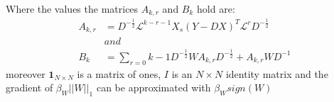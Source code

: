 Where the values the matrices $A_{k,r}$ and $B_k$ hold are:
\begin{align}
A_{k,r} &= D^{-\frac{1}{2}} \mathcal{L}^{k-r-1} X_s (Y - DX)^T \mathcal{L}^r D^{-\frac{1}{2}}\\
&and\\
B_k &= \sum_{r=0}{k-1}D^{-\frac{1}{2}} W A_{k,r} D^{-\frac{1}{2}} + A_{k,r} W D^{-1}
\end{align}
moreover $\textbf{1}_{N\times N}$ is a matrix of ones, $I$ is an $N\times N$ identity matrix and the gradient of $\beta_W||W||_1$ can be approximated with $\beta_W sign(W)$
